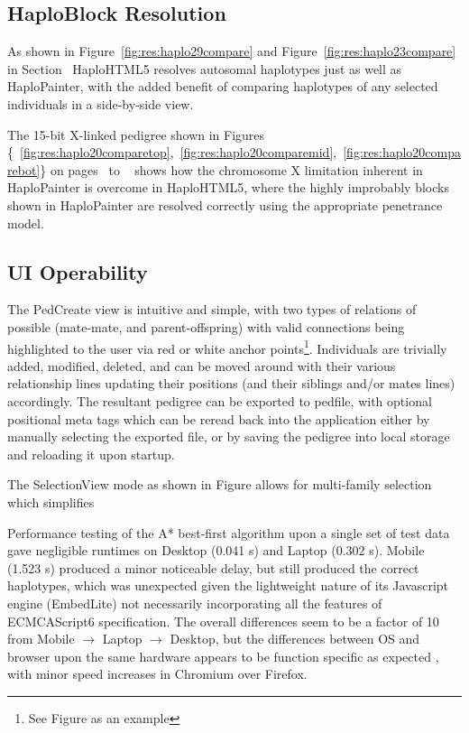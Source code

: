 \subsection{HaploBlock Resolution}
As shown in Figure~\ref{fig:res:haplo29compare} and Figure~\ref{fig:res:haplo23compare} in Section~ HaploHTML5 resolves autosomal haplotypes just as well as HaploPainter, with the added benefit of comparing haplotypes of any selected individuals in a side-by-side view. 

The 15-bit X-linked pedigree shown in Figures \{~\ref{fig:res:haplo20comparetop},~\ref{fig:res:haplo20comparemid},~\ref{fig:res:haplo20comparebot}\} on pages~\pageref*{fig:res:haplo20comparetop} to ~\pageref*{fig:res:haplo20comparebot} shows how the chromosome X limitation inherent in HaploPainter is overcome in HaploHTML5, where the highly improbably blocks shown in HaploPainter are resolved correctly using the appropriate penetrance model.

\subsection{UI Operability}
The PedCreate view is intuitive and simple, with two types of relations of possible (mate-mate, and parent-offspring) with valid connections being highlighted to the user via red or white anchor points\footnote{See Figure as an example}. Individuals are trivially added, modified, deleted, and can be moved around with their various relationship lines updating their positions (and their siblings and/or mates lines) accordingly. The resultant pedigree can be exported to pedfile, with optional positional meta tags which can be reread back into the application either by manually selecting the exported file, or by saving the pedigree into local storage and reloading it upon startup.

The SelectionView mode as shown in Figure allows for multi-family selection which simplifies 

Performance testing of the A* best-first algorithm upon a single set of test data gave negligible runtimes on Desktop (0.041 s) and Laptop (0.302 s). Mobile (1.523 s) produced a minor noticeable delay, but still produced the correct haplotypes, which was unexpected given the lightweight nature of its Javascript engine (EmbedLite) not necessarily incorporating all the features of ECMCAScript6 specification. The overall differences seem to be a factor of 10 from Mobile $\rightarrow$ Laptop $\rightarrow$ Desktop, but the differences between OS and browser upon the same hardware appears to be function specific as expected \cite{ratanaworabhan2010jsmeter}, with minor speed increases in Chromium over Firefox.

